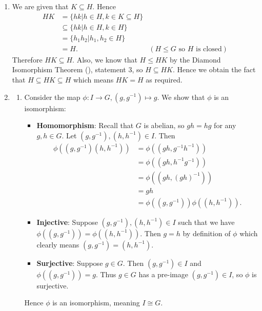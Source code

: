 \begin{enumerate}
    \item We are given that $K \subseteq H$. Hence
    \begin{align*}
        HK &= \{hk \vert h \in H, k \in K \subseteq H\}\\
        &\subseteq \{hk \vert h \in H, k \in H\}\\
        &= \{h_1h_2 \vert h_1, h_2 \in H\}\\
        &= H. & (H \leq G \text{ so } H \text{ is closed})
    \end{align*}
    Therefore $HK \subseteq H$. Also, we know that $H \leq HK$ by the Diamond Isomorphism Theorem (), statement 3, so $H \subseteq HK$. Hence we obtain the fact that $H \subseteq HK \subseteq H$ which means $HK = H$ as required.
    
    \item \begin{enumerate}[label=(\roman*)]
        \item Consider the map $\phi: I \to G, (g, g^{-1}) \mapsto g$. We show that $\phi$ is an isomorphism:
        \begin{itemize}
            \item \textbf{Homomorphism}: Recall that $G$ is abelian, so $gh = hg$ for any $g, h \in G$. Let $(g, g^{-1}), (h, h^{-1}) \in I$. Then
            \begin{align*}
                \phi((g, g^{-1})(h, h^{-1})) &= \phi((gh, g^{-1}h^{-1}))\\
                &= \phi((gh, h^{-1}g^{-1}))\\
                &= \phi((gh, (gh)^{-1}))\\
                &= gh\\
                &= \phi((g, g^{-1}))\phi((h, h^{-1})).
            \end{align*}

            \item \textbf{Injective}: Suppose $(g, g^{-1}), (h, h^{-1}) \in I$ such that we have $\phi((g, g^{-1})) = \phi((h, h^{-1}))$. Then $g = h$ by definition of $\phi$ which clearly means $(g, g^{-1}) = (h, h^{-1})$.

            \item \textbf{Surjective}: Suppose $g \in G$. Then $(g, g^{-1}) \in I$ and $\phi((g, g^{-1})) = g$. Thus $g \in G$ has a pre-image $(g, g^{-1}) \in I$, so $\phi$ is surjective.
        \end{itemize}
        Hence $\phi$ is an isomorphism, meaning $I \cong G$.
        

\end{enumerate}
\end{enumerate}
